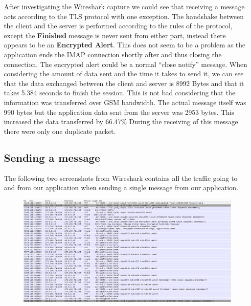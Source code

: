 After investigating the Wireshark capture we could see that receiving a message acts according to the TLS protocol with one exception. The handshake between the client and the server is performed according to the rules of the protocol, except the \textbf{Finished}  message is never sent from either part, instead there appears to be an \textbf{Encrypted Alert}. This does not seem to be a problem as the application ends the IMAP connection shortly after and thus closing the connection. The encrypted alert could be a normal “close notify” message.
\newline
\newline
When considering the amount of data sent and the time it takes to send it, we can see that the data exchanged between the client and server is 8992 Bytes and that it takes 5.384 seconds to finish the session. This is not bad considering that the information was transferred over GSM bandwidth. The actual message itself was 990 bytes but the application data sent from the server was 2953 bytes. This increased the data transferred by 66.47\% During the receiving of this message there were only one duplicate packet.

\subsection{Sending a message}

The following two screenshots from Wireshark contains all the traffic going to and from our application when sending a single message from our application.

\begin{figure}[h!]
\begin{center}
\includegraphics{ws4}
\end{center}
\end{figure}

